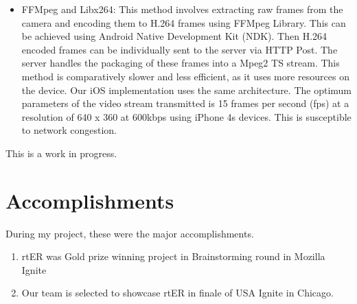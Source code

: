 \begin{itemize}
\begin{itemize}
			\item FFMpeg and Libx264: This method involves extracting raw frames from the camera and encoding them to H.264 frames using FFMpeg Library. This can be achieved using Android Native Development Kit (NDK). Then H.264 encoded frames can be individually sent to the server via HTTP Post. The server handles the packaging of these frames into a Mpeg2 TS stream. This method is comparatively slower and less efficient, as it uses more resources on the device. Our iOS implementation  uses the same architecture. The optimum parameters of the video stream transmitted is 15 frames per second (fps) at a resolution of 640 x 360 at 600kbps using iPhone 4s devices. This is susceptible to network congestion.		
		\end{itemize}
	This is a work in progress.	
	\end{itemize}
\section{Accomplishments}
During my project, these were the major accomplishments.
\begin{enumerate}
	\item rtER was Gold prize winning project in Brainstorming round in Mozilla Ignite
	\item Our team is selected to showcase rtER in finale of USA Ignite in Chicago.
\end{enumerate}
